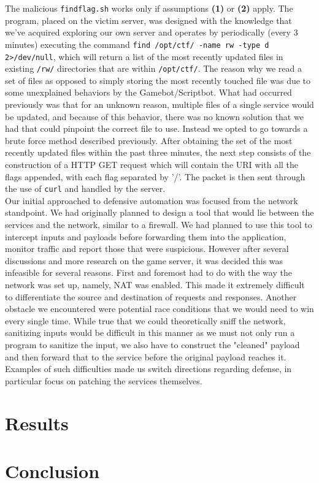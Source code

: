 \documentclass[12pt]{report}
\begin{document}
The malicious \texttt{findflag.sh} works only if assumptions \textbf{(1)} or \textbf{(2)} apply. The program, placed on the victim server, was designed with the knowledge that we've acquired exploring our own server and operates by periodically (every 3 minutes) executing the command \texttt{find /opt/ctf/ -name rw -type d 2>/dev/null}, which will return a list of the most recently updated files in existing \texttt{/rw/} directories that are within \texttt{/opt/ctf/}. The reason why we read a set of files as opposed to simply storing the most recently touched file was due to some unexplained behaviors by the Gamebot/Scriptbot. What had occurred previously was that for an unknown reason, multiple files of a single service would be updated, and because of this behavior, there was no known solution that we had that could pinpoint the correct file to use. Instead we opted to go towards a brute force method described previously. After obtaining the set of the most recently updated files within the past three minutes, the next step consists of the construction of a HTTP GET request which will contain the URI with all the flags appended, with each flag separated by '/'. The packet is then sent through the use of \texttt{curl} and handled by the server.\\

Our initial approached to defensive automation was focused from the network standpoint. We had originally planned to design a tool that would lie between the services and the network, similar to a firewall. We had planned to use this tool to intercept inputs and payloads before forwarding them into the application, monitor traffic and report those that were suspicious. However after several discussions and more research on the game server, it was decided this was infeasible for several reasons. First and foremost had to do with the way the network was set up, namely, NAT was enabled. This made it extremely difficult to differentiate the source and destination of requests and responses. Another obstacle we encountered were potential race conditions that we would need to win every single time. While true that we could theoretically sniff the network, sanitizing inputs would be difficult in this manner as we must not only run a program to sanitize the input, we also have to construct the "cleaned" payload and then forward that to the service before the original payload reaches it. Examples of such difficulties made us switch directions regarding defense, in particular focus on patching the services themselves. \\





\section*{Results}

\section*{Conclusion}
\end{document}
